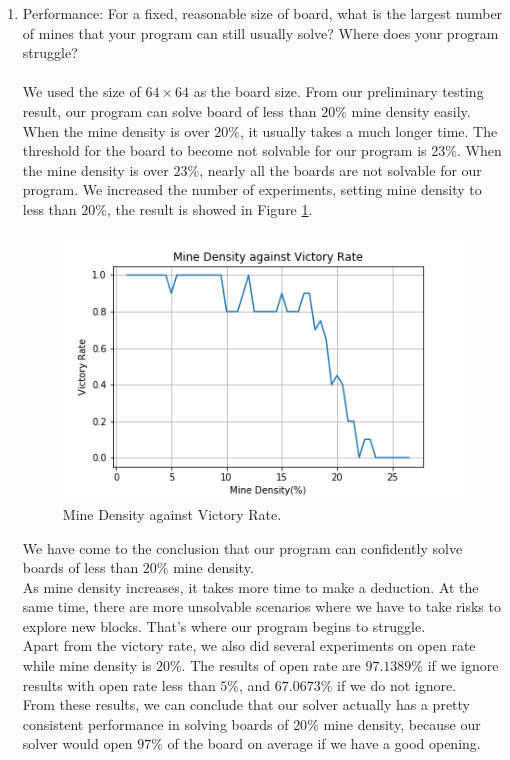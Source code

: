 \documentclass[letter]{article}
\begin{document}
\begin{enumerate}
	\label{zhichao1}
	\item {Performance: For a fixed, reasonable size of board, what is the largest number of mines that your program can still usually solve? Where does your program struggle?} \\
	\\
	We used the size of $ 64 \times 64 $ as the board size. From our preliminary testing result, our program can solve board of less than $ 20\% $ mine density easily. When the mine density is over $ 20\% $, it usually takes a much longer time. The threshold for the board to become not solvable for our program is $ 23\% $. When the mine density is over $ 23\% $, nearly all the boards are not solvable for our program. We increased the number of experiments, setting mine density to less than $ 20\% $, the result is showed in Figure \ref{fig:Mine-Density-against-Victory-Rate}.
	
	\begin{figure}[H]
		\centering
		\includegraphics[scale=0.75]{../pics/Mine-Density-against-Victory-Rate.png}
		\caption{\label{fig:Mine-Density-against-Victory-Rate}Mine Density against Victory Rate.}
	\end{figure}
	
	We have come to the conclusion that our program can confidently solve boards of less than $ 20\% $ mine density. \\ 
	As mine density increases, it takes more time to make a deduction. At the same time, there are more unsolvable scenarios where we have to take risks to explore new blocks. That’s where our program begins to struggle. \\
	Apart from the victory rate, we also did several experiments on open rate while mine density is $ 20\% $. The results of open rate are $ 97.1389\% $ if we ignore results with open rate less than $ 5\% $, and $ 67.0673\% $ if we do not ignore. \\
	From these results, we can conclude that our solver actually has a pretty consistent performance in solving boards of $ 20\% $ mine density, because our solver would  open $ 97\% $ of the board on average if we have a good opening. \\
	

\end{enumerate}
\end{document}
